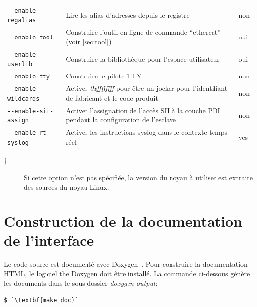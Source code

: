 \documentclass[a4paper,12pt,BCOR6mm,bibtotoc,idxtotoc]{scrbook}
\begin{document}
\begin{longtable}{l|p{}|l}
\lstinline+--enable-regalias+ & Lire les alias d'adresses depuis le
registre & non\\

\lstinline+--enable-tool+ & Construire l'outil en ligne de commande
``ethercat'' (voir \autoref{sec:tool}) & oui\\

\lstinline+--enable-userlib+ & Construire la biblioth\`eque pour
l'espace utilisateur & oui\\

\lstinline+--enable-tty+ & Construire le pilote TTY & non\\

\lstinline+--enable-wildcards+ & Activer \textit{0xffffffff} pour \^etre
un jocker pour l'identifiant de fabricant et le code produit & non\\

\lstinline+--enable-sii-assign+ & Activer l'assignation de l'acc\`es SII
\`a la couche PDI pendant la configuration de l'esclave & non\\

\lstinline+--enable-rt-syslog+ & Activer les instructions syslog dans
le contexte temps r\'eel & yes\\

\hline

\end{longtable}

\begin{description}

\item[$\dagger$] Si cette option n'est pas sp\'ecifi\'ee, la version du noyau
  \`a utiliser est extraite des sources du noyau Linux.

\end{description}

\section{Construction de la documentation de l'interface}
\label{sec:gendoc}

Le code source est document\'e avec
Doxygen~\cite{doxygen}. Pour construire la documentation HTML,
le logiciel the Doxygen doit \^etre install\'e. La commande ci-dessous
g\'en\`ere les documents dans le sous-dossier \textit{doxygen-output}:

\begin{lstlisting}
$ `\textbf{make doc}`
\end{lstlisting}
\end{document}
